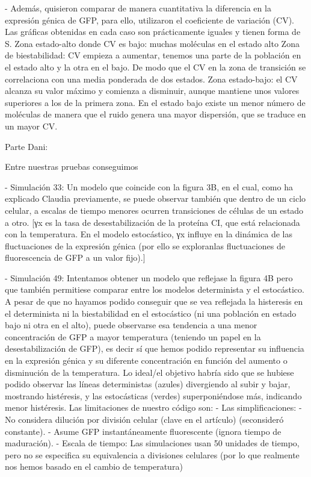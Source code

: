 - Además, quisieron comparar de manera cuantitativa la diferencia en la expresión génica de GFP, para ello, utilizaron el coeficiente de variación (CV). Las gráficas obtenidas en cada caso son prácticamente iguales y tienen forma de S. 
	Zona estado-alto donde CV es bajo: muchas moléculas en el estado alto 
	Zona de biestabilidad: CV empieza a aumentar, tenemos una parte de la población en el estado alto y la otra en el bajo. De modo que el CV en la zona de transición se correlaciona con una media ponderada de dos estados.
	Zona estado-bajo: el CV alcanza su valor máximo y comienza a disminuir, aunque mantiene unos valores superiores a los de la primera zona. En el estado bajo existe un menor número de moléculas de manera que el ruido genera una mayor dispersión, que se traduce en un mayor CV.


Parte Dani:

Entre nuestras pruebas conseguimos

- Simulación 33: Un modelo que coincide con la figura 3B, en el cual, como ha explicado Claudia previamente, se puede observar también que dentro de un ciclo celular, a escalas de tiempo menores ocurren transiciones de células de un estado a otro.
	[γx es la tasa de desestabilización de la proteína CI, que está relacionada con la temperatura. En el modelo estocástico, γx influye en la dinámica de las fluctuaciones de la expresión génica (por ello se exploranlas fluctuaciones de  fluorescencia de GFP a un valor fijo).]

- Simulación 49: Intentamos obtener un modelo que reflejase la figura 4B pero que también permitiese comparar entre los modelos determinista y el estocástico. A pesar de que no hayamos podido conseguir que se vea reflejada la histeresis en el determinista ni la biestabilidad en el estocástico (ni una población en estado bajo ni otra en el alto), puede observarse esa tendencia a una menor concentración de GFP a mayor temperatura (teniendo un papel en la desestabilización de GFP), es decir sí que hemos podido representar su influencia en la expresión génica y su diferente concentración en función del aumento o disminución de la temperatura. 
Lo ideal/el objetivo habría sido que se hubiese podido observar las líneas deterministas (azules) divergiendo al subir y bajar, mostrando histéresis, y las estocásticas (verdes) superponiéndose más, indicando menor histéresis. 
Las limitaciones de nuestro código son:
- Las simplificaciones: 
	- No considera dilución por división celular (clave en el artículo) (seconsideró constante). 
	- Asume GFP instantáneamente fluorescente (ignora tiempo de maduración). 
- Escala de tiempo: Las simulaciones usan 50 unidades de tiempo, pero no se especifica su equivalencia a divisiones celulares (por lo que realmente nos hemos basado en el cambio de temperatura)
	

